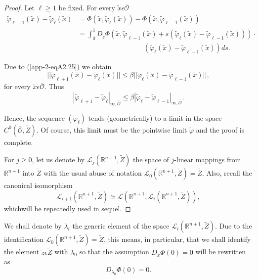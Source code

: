 \begin{proof}
Let $\ell \geq 1$ be fixed. For every $\widetilde{x} \epsilon
\overline{\mathscr{O}}$ 
\begin{align*}
\widetilde{\varphi}_{\ell + 1} (\widetilde{x}) -
\widetilde{\varphi}_{\ell} (\widetilde{x}) & = \Phi(\widetilde{x},
\widetilde{\varphi}_{\ell}(\widetilde{x})) - \Phi(\widetilde{x},
\widetilde{\varphi}_{\ell - 1} (\widetilde{x})) \\
& = \int_{0}^{1} D_{\widetilde{z}}\Phi (\widetilde{x},
\widetilde{\varphi}_{\ell - 1} (\widetilde{x}) +
s(\widetilde{\varphi}_{\ell} (\widetilde{x}) -
\widetilde{\varphi}_{\ell - 1} (\widetilde{x}))) \cdot\\
&\hspace{4cm}(\widetilde{\varphi}_{\ell}(\widetilde{x}) - \widetilde{\varphi}_{\ell
- 1} (\widetilde{x})) ds.
\end{align*}

Due to (\ref{app-2-eqA2.25}) we obtain
$$
||\widetilde{\varphi}_{\ell + 1} (\widetilde{x}) -
\widetilde{\varphi}_{\ell} (\widetilde{x})|| \leq \beta
||\widetilde{\varphi}_{\ell} (\widetilde{x}) -
\widetilde{\varphi}_{\ell - 1} (\widetilde{x})||,
$$
for every $\widetilde{x} \epsilon \overline{\mathscr{O}}$. Thus
$$
|\widetilde{\varphi}_{\ell + 1} - \widetilde{\varphi}_{\ell}|_{\infty,
\overline{\mathscr{O}}} \leq \beta |\widetilde{\varphi}_{\ell} -
\widetilde{\varphi}_{\ell - 1}|_{\infty, \overline{\mathscr{O}}}.
$$

Hence, the sequence $(\widetilde{\varphi}_{\ell})$ tends
(geometrically) to a limit in the space $C^{0}(\overline{\mathscr{O}},
\widetilde{Z})$. Of course, this limit must be the pointwise limit
$\widetilde{\varphi}$ and the proof is complete.

For $j \geq 0$, let us denote by $\mathscr{L}_{j} (\mathbb{R}^{n+1},
\widetilde{Z})$ the space of $j$-linear mappings from $\mathbb{R}^{n+1}$
into $\widetilde{Z}$ with the usual abuse of notation
$\mathscr{L}_{0}(\mathbb{R}^{n+1}, \widetilde{Z}) =
\widetilde{Z}$. Also, recall the canonical isomorphism
\begin{equation*}
\mathscr{L}_{i+1} (\mathbb{R}^{n+1}, \widetilde{Z}) \simeq
\mathscr{L}(\mathbb{R}^{n+1}, \mathscr{L}_{i}(\mathbb{R}^{n+1},
\widetilde{Z})),\tag{A2.26} \label{app-2-eqA2.26}
\end{equation*}
which\pageoriginale will be repeatedly used in sequel.
\end{proof} 

We shall denote by $\lambda_{i}$ the generic element of the space
$\mathscr{L}_{i}(\mathbb{R}^{n+1}, \widetilde{Z})$. Due to the
identification $\mathscr{L}_{0} (\mathbb{R}^{n+1}, \widetilde{Z}) =
\widetilde{Z}$, this means, in particular, that we shall identify the
element $\widetilde{z} \epsilon \widetilde{Z}$ with $\lambda_{0}$ so
that the assumption $D_{\widetilde{x}}\Phi(0) = 0$ will be rewritten
as
\begin{equation*}
D_{\lambda_{0}} \Phi(0) = 0.\tag{A2.27}\label{app-2-eqA2.27}
\end{equation*}

